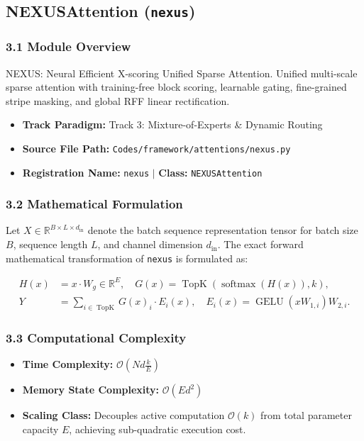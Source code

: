 \subsection{NEXUSAttention (\texttt{nexus})}
\label{sec:app_module_nexus}

\subsubsection*{3.1 Module Overview}
NEXUS: Neural Efficient X-scoring Unified Sparse Attention.  Unified multi-scale sparse attention with training-free block scoring, learnable gating, fine-grained stripe masking, and global RFF linear rectification.
\begin{itemize}
    \item \textbf{Track Paradigm:} Track 3: Mixture-of-Experts \& Dynamic Routing
    \item \textbf{Source File Path:} \texttt{Codes/framework/attentions/nexus.py}
    \item \textbf{Registration Name:} \texttt{nexus} $\mid$ \textbf{Class:} \texttt{NEXUSAttention}
\end{itemize}

\subsubsection*{3.2 Mathematical Formulation}
Let $X \in \mathbb{R}^{B \times L \times d_{\text{in}}}$ denote the batch sequence representation tensor for batch size $B$, sequence length $L$, and channel dimension $d_{\text{in}}$. The exact forward mathematical transformation of \texttt{nexus} is formulated as:

\begin{align}
H(x) &= x \cdot W_g \in \mathbb{R}^{E}, \quad G(x) = \operatorname{TopK}\left(\operatorname{softmax}(H(x)), k\right), \\
Y &= \sum_{i \in \operatorname{TopK}} G(x)_i \cdot E_i(x), \quad E_i(x) = \operatorname{GELU}(x W_{1, i}) W_{2, i}.
\end{align}


\subsubsection*{3.3 Computational Complexity}
\begin{itemize}
    \item \textbf{Time Complexity:} $\mathcal{O}(N d \frac{k}{E})$
    \item \textbf{Memory State Complexity:} $\mathcal{O}(E d^2)$
    \item \textbf{Scaling Class:} Decouples active computation $\mathcal{O}(k)$ from total parameter capacity $E$, achieving sub-quadratic execution cost.
\end{itemize}

